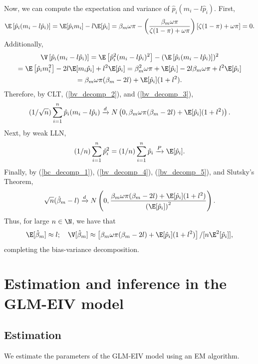 \documentclass[11pt]{article}
\begin{document}
\begin{appendices}
\begin{refsection}
Now, we can compute the expectation and variance of $\hat{p}_i(m_i - l\hat{p}_i)$. First,
\begin{equation}\label{bv_decomp_2}
\E\left[\hat{p}_i(m_i - l\hat{p}_i) \right] = \E[\hat{p}_i m_i] - l \E[\hat{p}_i] = \beta_m \omega \pi - \left(\frac{\beta_m \omega \pi}{\zeta (1-\pi) + \omega \pi}\right)[\zeta (1-\pi) + \omega \pi] = 0.
\end{equation}
Additionally,
\begin{multline}\label{bv_decomp_3}
\V\left[\hat{p}_i(m_i - l\hat{p}_i)\right] = \E\left[\hat{p}_i^2(m_i - l\hat{p}_i)^2\right] - (\E\left[ \hat{p}_i(m_i - l\hat{p}_i)\right])^2 \\ = \E\left[ \hat{p}_i m_i^2\right] - 2l \E[m_i\hat{p}_i] +l^2 \E[\hat{p}_i]= \beta^2_m \omega \pi + \E[ \hat{p}_i] -2l \beta_m \omega \pi + l^2 \E[\hat{p}_i] \\ = \beta_m\omega\pi(\beta_m - 2l) + \E[\hat{p}_i](1 + l^2).
\end{multline}
Therefore, by CLT, (\ref{bv_decomp_2}), and (\ref{bv_decomp_3}),
\begin{equation}\label{bv_decomp_4}
(1/\sqrt{n})\sum_{i=1}^n \hat{p}_i(m_i - l \hat{p}_i) \xrightarrow{d} N\left(0, \beta_m\omega\pi(\beta_m - 2l) + \E[\hat{p}_i](1 + l^2) \right).
\end{equation}
Next, by weak LLN,
\begin{equation}\label{bv_decomp_5}
(1/n) \sum_{i=1}^n \hat{p}_i^2 = (1/n) \sum_{i=1}^n \hat{p}_i \xrightarrow{P} \E[\hat{p}_i].
\end{equation}
Finally, by (\ref{bc_decomp_1}), (\ref{bv_decomp_4}), (\ref{bv_decomp_5}), and Slutsky's Theorem,
$$ \sqrt{n}(\hat{\beta}_m - l) \xrightarrow{d} N\left(0, \frac{ \beta_m\omega\pi(\beta_m - 2l) + \E[\hat{p}_i](1 + l^2) }{\left(\E[\hat{p}_i]\right)^2} \right).$$ Thus, for large $n \in \N$, we have that 
$$
\E [\hat{\beta}_m] \approx l; \quad
\V[\hat{\beta}_m] \approx \left[\beta_m\omega\pi(\beta_m - 2l) + \E[\hat{p}_i](1 + l^2)\right]/[n\E^2[\hat{p}_i]],$$
completing the bias-variance decomposition.

\section{Estimation and inference in the GLM-EIV model}\label{sec:glmeiv_details}
\subsection{Estimation}
We estimate the parameters of the GLM-EIV model using an EM algorithm.

\end{refsection}
\end{appendices}
\end{document}
